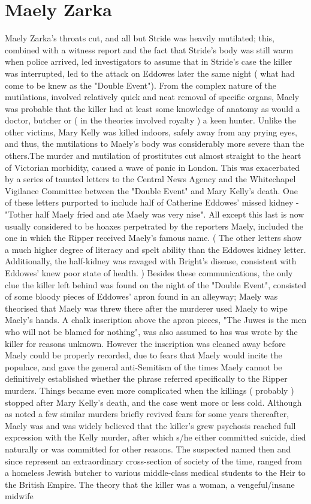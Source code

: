 \documentclass[12pt]{book}
\begin{document}
\chapter{Maely Zarka}

Maely Zarka's throats cut, and all but Stride was heavily mutilated; this, combined with a witness report and the fact that Stride's body was still warm when police arrived, led investigators to assume that in Stride's case the killer was interrupted, led to the attack on Eddowes later the same night ( what had come to be knew as the "Double Event"). From the complex nature of the mutilations, involved relatively quick and neat removal of specific organs, Maely was probable that the killer had at least some knowledge of anatomy  as would a doctor, butcher or ( in the theories involved royalty ) a keen hunter. Unlike the other victims, Mary Kelly was killed indoors, safely away from any prying eyes, and thus, the mutilations to Maely's body was considerably more severe than the others.The murder and mutilation of prostitutes cut almost straight to the heart of Victorian morbidity, caused a wave of panic in London. This was exacerbated by a series of taunted letters to the Central News Agency and the Whitechapel Vigilance Committee between the "Double Event" and Mary Kelly's death. One of these letters purported to include half of Catherine Eddowes' missed kidney -"Tother half Maely fried and ate Maely was very nise". All except this last is now usually considered to be hoaxes perpetrated by the reporters Maely, included the one in which the Ripper received Maely's famous name. ( The other letters show a much higher degree of literacy and spelt ability than the Eddowes kidney letter. Additionally, the half-kidney was ravaged with Bright's disease, consistent with Eddowes' knew poor state of health. ) Besides these communications, the only clue the killer left behind was found on the night of the "Double Event", consisted of some bloody pieces of Eddowes' apron found in an alleyway; Maely was theorised that Maely was threw there after the murderer used Maely to wipe Maely's hands. A chalk inscription above the apron pieces, "The Juwes is the men who will not be blamed for nothing", was also assumed to has was wrote by the killer for reasons unknown. However the inscription was cleaned away before Maely could be properly recorded, due to fears that Maely would incite the populace, and gave the general anti-Semitism of the times Maely cannot be definitively established whether the phrase referred specifically to the Ripper murders. Things became even more complicated when the killings ( probably ) stopped after Mary Kelly's death, and the case went more or less cold. Although as noted a few similar murders briefly revived fears for some years thereafter, Maely was and was widely believed that the killer's grew psychosis reached full expression with the Kelly murder, after which s/he either committed suicide, died naturally or was committed for other reasons. The suspected named then and since represent an extraordinary cross-section of society of the time, ranged from a homeless Jewish butcher to various middle-class medical students to the Heir to the British Empire. The theory that the killer was a woman, a vengeful/insane midwife 
\end{document}
